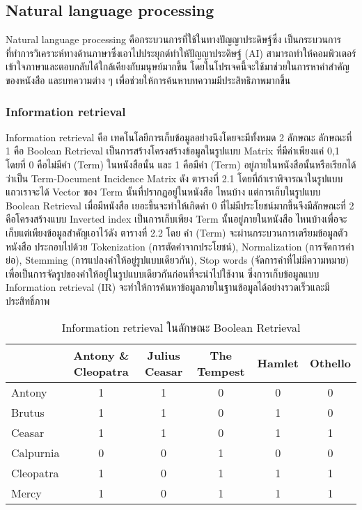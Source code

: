 \subsection{Natural language processing}

Natural language processing คือกระบวนการที่ใช้ในทางปัญญาประดิษฐ์ซึ่ง เป็นกระบวนการที่ทำการวิเคราะห์ทางด้านภาษาซึ่งเอาไปประยุกต์ทำให้ปัญญาประดิษฐ์ (AI) สามารถทำให้คอมพิวเตอร์เข้าใจภาษาและตอบกลับได้ใกล้เคียงกับมนุษย์มากขึ้น โดยในโปรเจคนี้จะใช้มาช่วยในการหาคำสำคัญของหนังสือ และบทความต่าง ๆ เพื่อช่วยให้การค้นหาบทความมีประสิทธิภาพมากขึ้น

\subsubsection{Information retrieval}

Information retrieval คือ เทคโนโลยีการเก็บข้อมูลอย่างนึงโดยจะมีทั้งหมด 2 ลักษณะ ลักษณะที่ 1 คือ Boolean Retrieval เป็นการสร้างโครงสร้างข้อมูลในรูปแบบ Matrix ที่มีค่าเพียงแค่ 0,1 โดยที่ 0 คือไม่มีคำ (Term) ในหนังสือนั้น และ 1 คือมีคำ (Term) อยู่ภายในหนังสือนั้นหรือเรียกได้ว่าเป็น Term-Document Incidence  Matrix ดัง ตารางที่ 2.1 โดยที่ถ้าเราพิจารณาในรูปแบบแถวเราจะได้ Vector ของ Term นั้นที่ปรากฏอยู่ในหนังสือ ไหนบ้าง แต่การเก็บในรูปแบบ Boolean Retrieval เมื่อมีหนังสือ เยอะขึ้นจะทำให้เกิดค่า 0 ที่ไม่มีประโยชน์มากขึ้นจึงมีลักษณะที่ 2 คือโครงสร้างแบบ Inverted index เป็นการเก็บเพียง Term นั้นอยู่ภายในหนังสือ ไหนบ้างเพื่อจะเก็บแต่เพียงข้อมูลสำคัญเอาไว้ดัง ตารางที่ 2.2 โดย คำ (Term) จะผ่านกระบวนการเตรียมข้อมูลตัวหนังสือ ประกอบไปด้วย Tokenization (การตัดคำจากประโยชน์), Normalization (การจัดการคำย่อ), Stemming (การแปลงคำให้อยู่รูปแบบเดียวกัน), Stop words (จัดการคำที่ไม่มีความหมาย) เพื่อเป็นการจัดรูปของคำให้อยู่ในรูปแบบเดียวกันก่อนที่จะนำไปใช้งาน ซึ่งการเก็บข้อมูลแบบ Information retrieval (IR) จะทำให้การค้นหาข้อมูลภายในฐานข้อมูลได้อย่างรวดเร็วและมีประสิทธิ์ภาพ
\begin{table}[H]
\caption{Information retrieval ในลักษณะ Boolean Retrieval}\label{tbl:ir}
    \begin{tabular}{|l|c|c|c|c|c|}
        \hline
                  & Antony \& Cleopatra & Julius Ceasar & The Tempest & Hamlet & Othello \\ \hline
        Antony    & 1                   & 1             & 0           & 0      & 0       \\ \hline
        Brutus    & 1                   & 1             & 0           & 1      & 0       \\ \hline
        Ceasar    & 1                   & 1             & 0           & 1      & 1       \\ \hline
        Calpurnia & 0                   & 0             & 1           & 0      & 0       \\ \hline
        Cleopatra & 1                   & 0             & 1           & 1      & 1       \\ \hline
        Mercy     & 1                   & 0             & 1           & 1      & 1       \\ \hline
        \end{tabular}
\end{table}

